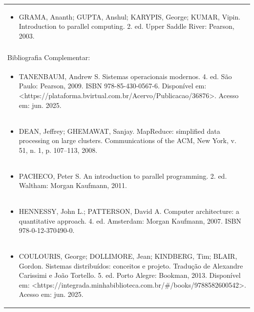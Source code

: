 \documentclass[11pt]{article}
\begin{document}
\begin{center}
\begin{longtable}{|p{4cm}|p{4cm}|p{4cm}|p{4cm}|}
\multicolumn{4}{|p{\dimexpr 16cm + 6\tabcolsep\relax}|}{\begin{itemize}\item GRAMA, Ananth; GUPTA, Anshul; KARYPIS, George; KUMAR, Vipin. Introduction to parallel computing. 2. ed. Upper Saddle River: Pearson, 2003.\end{itemize}}\\
\multicolumn{4}{|p{16cm}|}{}\\
\hline
\multicolumn{4}{|p{16cm}|}{Bibliografia Complementar:}\\*
\multicolumn{4}{|p{\dimexpr 16cm + 6\tabcolsep\relax}|}{\begin{itemize}\item TANENBAUM, Andrew S. Sistemas operacionais modernos. 4. ed. São Paulo: Pearson, 2009. ISBN 978-85-430-0567-6. Disponível em: <https://plataforma.bvirtual.com.br/Acervo/Publicacao/36876>. Acesso em: jun. 2025.\end{itemize}}\\
\multicolumn{4}{|p{\dimexpr 16cm + 6\tabcolsep\relax}|}{\begin{itemize}\item DEAN, Jeffrey; GHEMAWAT, Sanjay. MapReduce: simplified data processing on large clusters. Communications of the ACM, New York, v. 51, n. 1, p. 107–113, 2008.\end{itemize}}\\
\multicolumn{4}{|p{\dimexpr 16cm + 6\tabcolsep\relax}|}{\begin{itemize}\item PACHECO, Peter S. An introduction to parallel programming. 2. ed. Waltham: Morgan Kaufmann, 2011.\end{itemize}}\\
\multicolumn{4}{|p{\dimexpr 16cm + 6\tabcolsep\relax}|}{\begin{itemize}\item HENNESSY, John L.; PATTERSON, David A. Computer architecture: a quantitative approach. 4. ed. Amsterdam: Morgan Kaufmann, 2007. ISBN 978-0-12-370490-0.\end{itemize}}\\
\multicolumn{4}{|p{\dimexpr 16cm + 6\tabcolsep\relax}|}{\begin{itemize}\item COULOURIS, George; DOLLIMORE, Jean; KINDBERG, Tim; BLAIR, Gordon. Sistemas distribuídos: conceitos e projeto. Tradução de Alexandre Carissimi e João Tortello. 5. ed. Porto Alegre: Bookman, 2013. Disponível em: <https://integrada.minhabiblioteca.com.br/\#/books/9788582600542>. Acesso em: jun. 2025.\end{itemize}}\\
\hline
\end{longtable}
\end{center}
\end{document}
